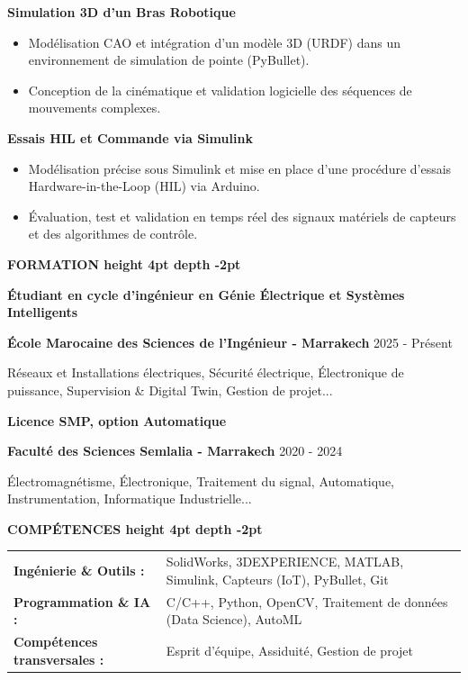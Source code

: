 \documentclass[10pt,a4paper]{altacv}
\renewcommand{\cvsection}[2][]{%
  \medskip%
  {\color{heading}\LARGE\bfseries #2 \hspace{0.2em}\leaders\vrule height 4pt depth -2pt\hfill\mbox{}}\par\smallskip
}
\renewcommand{\cvevent}[4]{%
  {\large\bfseries\color{accent}#1\par}
  \smallskip\normalsize
  \ifstrequal{#2}{}{}{%
    \textbf{\color{emphasis}#2\ifstrequal{#4}{}{}{ - #4}}%
  }%
  \hfill
  \ifstrequal{#3}{}{}{{\small#3}}%
  \par\smallskip
}
\begin{document}
{\large\bfseries\color{accent} Simulation 3D d'un Bras Robotique}\\[0.05cm]
\begin{itemize}
  \item Modélisation CAO et intégration d'un modèle 3D (URDF) dans un environnement de simulation de pointe (PyBullet).
  \item Conception de la cinématique et validation logicielle des séquences de mouvements complexes.
\end{itemize}

{\large\bfseries\color{accent} Essais HIL et Commande via Simulink}\\[0.05cm]
\begin{itemize}
  \item Modélisation précise sous Simulink et mise en place d'une procédure d'essais Hardware-in-the-Loop (HIL) via Arduino.
  \item Évaluation, test et validation en temps réel des signaux matériels de capteurs et des algorithmes de contrôle.
\end{itemize}


\cvsection{FORMATION}
\cvevent{Étudiant en cycle d'ingénieur en Génie Électrique et Systèmes Intelligents}{École Marocaine des Sciences de l'Ingénieur}{2025 - Présent}{Marrakech}
\small Réseaux et Installations électriques, Sécurité électrique, Électronique de puissance, Supervision \& Digital Twin, Gestion de projet...

\cvevent{Licence SMP, option Automatique}{Faculté des Sciences Semlalia}{2020 - 2024}{Marrakech}
\small Électromagnétisme, Électronique, Traitement du signal, Automatique, Instrumentation, Informatique Industrielle...

\cvsection{COMPÉTENCES}
\begin{tabular}{@{}ll@{}}
\textbf{Ingénierie \& Outils :} & SolidWorks, 3DEXPERIENCE, MATLAB, Simulink, Capteurs (IoT), PyBullet, Git \\[2pt]
\textbf{Programmation \& IA :} & C/C++, Python, OpenCV, Traitement de données (Data Science), AutoML \\[2pt]
\textbf{Compétences transversales :} & Esprit d'équipe, Assiduité, Gestion de projet \\
\end{tabular}
\end{document}
